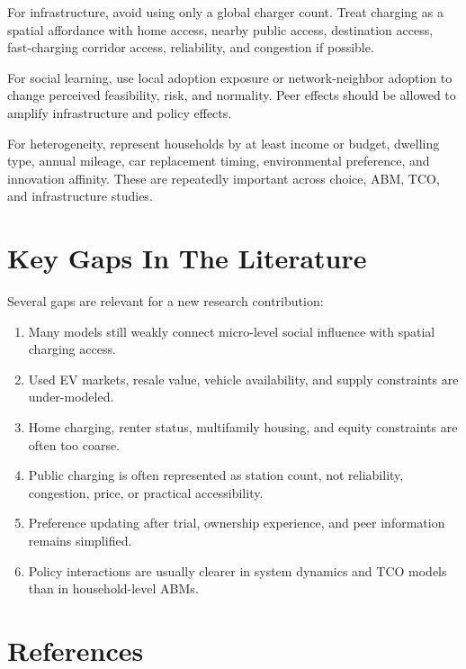 \documentclass[11pt]{article}
\begin{document}
For infrastructure, avoid using only a global charger count. Treat charging as a
spatial affordance with home access, nearby public access, destination access,
fast-charging corridor access, reliability, and congestion if possible.

For social learning, use local adoption exposure or network-neighbor adoption to
change perceived feasibility, risk, and normality. Peer effects should be
allowed to amplify infrastructure and policy effects.

For heterogeneity, represent households by at least income or budget, dwelling
type, annual mileage, car replacement timing, environmental preference, and
innovation affinity. These are repeatedly important across choice, ABM, TCO, and
infrastructure studies.

\section{Key Gaps In The Literature}

Several gaps are relevant for a new research contribution:

\begin{enumerate}
    \item Many models still weakly connect micro-level social influence with
    spatial charging access.
    \item Used EV markets, resale value, vehicle availability, and supply
    constraints are under-modeled.
    \item Home charging, renter status, multifamily housing, and equity
    constraints are often too coarse.
    \item Public charging is often represented as station count, not
    reliability, congestion, price, or practical accessibility.
    \item Preference updating after trial, ownership experience, and peer
    information remains simplified.
    \item Policy interactions are usually clearer in system dynamics and TCO
    models than in household-level ABMs.
\end{enumerate}

\section*{References}
\end{document}
